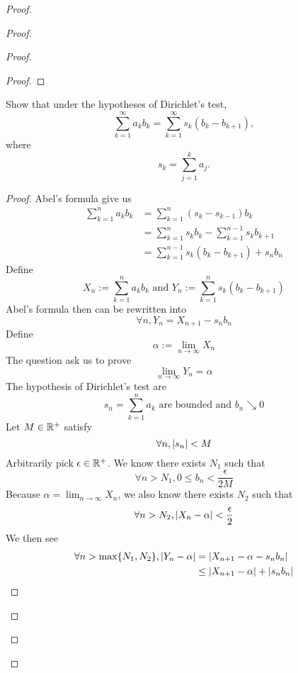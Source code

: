 \documentclass{report}
\begin{document}
\begin{proof}
\begin{proof}
\begin{proof}
\begin{proof}
\end{proof}

\begin{question}{}{}
Show that under the hypotheses of Dirichlet’s test,
\[
\sum_{k=1}^{\infty} a_k b_k = \sum_{k=1}^{\infty} s_k (b_k - b_{k+1}),
\]
where 
\[
s_k = \sum_{j=1}^{k} a_j.
\]
\end{question}
\begin{proof}
Abel's formula give us
\begin{align}
\sum_{k=1}^na_kb_k&=\sum_{k=1}^n (s_{k}-s_{k-1})b_k\\
&=\sum_{k=1}^n s_kb_k-\sum_{k=1}^{n-1} s_kb_{k+1}\\
&=\sum_{k=1}^{n-1}s_k(b_k-b_{k+1})+s_nb_n
\end{align}
Define 
\begin{equation}
X_n:=\sum_{k=1}^n a_kb_k\text{ and }Y_n:=\sum_{k=1}^{n}s_k(b_k-b_{k+1})
\end{equation}
Abel's formula then can be rewritten into
\begin{equation}
\forall n,Y_n=X_{n+1}-s_nb_n
\end{equation}
Define
\begin{equation}
\alpha :=\lim_{n\to\infty}X_n 
\end{equation}
The question ask us to prove
\begin{equation}
\lim_{n\to\infty}Y_n=\alpha 
\end{equation}
The hypothesis of Dirichlet's test are 
\begin{equation}
  s_n=\sum_{k=1}^n a_k\text{ are bounded and }b_n\searrow 0 
\end{equation}
Let $M\in\mathbb{R}^+$ satisfy
\begin{equation}
\forall n, |s_n|<M
\end{equation}
Arbitrarily pick $\epsilon\in\mathbb{R}^+$. We know there exists $N_1$ such that
 \begin{equation}
\forall n>N_1, 0\leq b_n<\frac{\epsilon }{2M}
\end{equation}
Because  $\alpha =\lim_{n\to\infty}X_n$, we also know there exists $N_2$ such that
 \begin{equation}
\forall n>N_2, |X_n-\alpha |<\frac{\epsilon }{2}
\end{equation}
We then see 
\begin{align}
  \forall n>\max \set{N_1,N_2}, \abso{Y_n-\alpha }&=\abso{X_{n+1}-\alpha -s_nb_n}\\
  &\leq \abso{X_{n+1}-\alpha }+\abso{s_nb_n}\\

\end{align}
\end{proof}
\end{proof}
\end{proof}
\end{proof}
\end{document}
